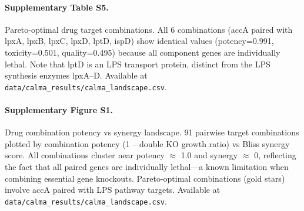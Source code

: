 \documentclass[12pt,a4paper]{article}
\begin{document}
\paragraph{Supplementary Table S5.} Pareto-optimal drug target combinations. All 6 combinations (accA paired with lpxA, lpxB, lpxC, lpxD, lptD, ispD) show identical values (potency=0.991, toxicity=0.501, quality=0.495) because all component genes are individually lethal. Note that lptD is an LPS transport protein, distinct from the LPS synthesis enzymes lpxA--D. Available at \texttt{data/calma\_results/calma\_landscape.csv}.

\paragraph{Supplementary Figure S1.} Drug combination potency vs synergy landscape. 91 pairwise target combinations plotted by combination potency (1 -- double KO growth ratio) vs Bliss synergy score. All combinations cluster near potency $\approx$ 1.0 and synergy $\approx$ 0, reflecting the fact that all paired genes are individually lethal---a known limitation when combining essential gene knockouts. Pareto-optimal combinations (gold stars) involve accA paired with LPS pathway targets. Available at \texttt{data/calma\_results/calma\_landscape.csv}.
\end{document}
